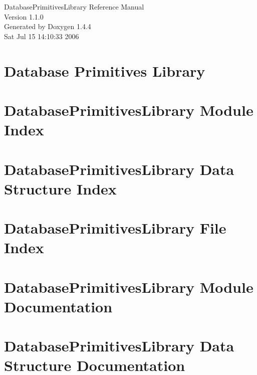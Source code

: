 \documentclass[letterpaper]{book}
\begin{document}
\begin{titlepage}
\vspace*{7cm}
\begin{center}
{\Large Database\-Primitives\-Library Reference Manual\\[1ex]\large Version 1.1.0 }\\
\vspace*{1cm}
{\large Generated by Doxygen 1.4.4}\\
\vspace*{0.5cm}
{\small Sat Jul 15 14:10:33 2006}\\
\end{center}
\end{titlepage}
\clearemptydoublepage
{}
\tableofcontents
\clearemptydoublepage
{}
\chapter{Database Primitives Library }
\label{index}\hypertarget{index}{}
\chapter{Database\-Primitives\-Library Module Index}

\chapter{Database\-Primitives\-Library Data Structure Index}

\chapter{Database\-Primitives\-Library File Index}

\chapter{Database\-Primitives\-Library Module Documentation}





\chapter{Database\-Primitives\-Library Data Structure Documentation}















\end{document}
